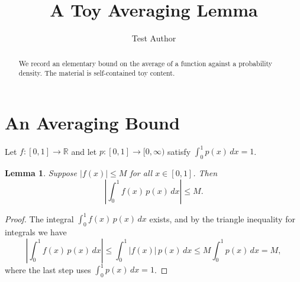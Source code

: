 \documentclass{article}
\newtheorem{lemma}{Lemma}
\begin{document}
\title{A Toy Averaging Lemma}
\author{Test Author}
\maketitle

\begin{abstract}
We record an elementary bound on the average of a function against a
probability density. The material is self-contained toy content.
\end{abstract}

\section{An Averaging Bound}
Let $f : [0, 1] \to \mathbb{R}$ and let $p : [0, 1] \to [0, \infty)$ satisfy
$\int_0^1 p(x)\, dx = 1$.

\begin{lemma}
\label{lem:average}
Suppose $|f(x)| \le M$ for all $x \in [0, 1]$. Then
\[
  \left| \int_0^1 f(x)\, p(x)\, dx \right| \le M.
\]
\end{lemma}

\begin{proof}
The integral $\int_0^1 f(x)\, p(x)\, dx$ exists, and by the triangle inequality
for integrals we have
\[
  \left| \int_0^1 f(x)\, p(x)\, dx \right|
    \le \int_0^1 |f(x)|\, p(x)\, dx
    \le M \int_0^1 p(x)\, dx = M,
\]
where the last step uses $\int_0^1 p(x)\, dx = 1$.
\end{proof}
\end{document}
